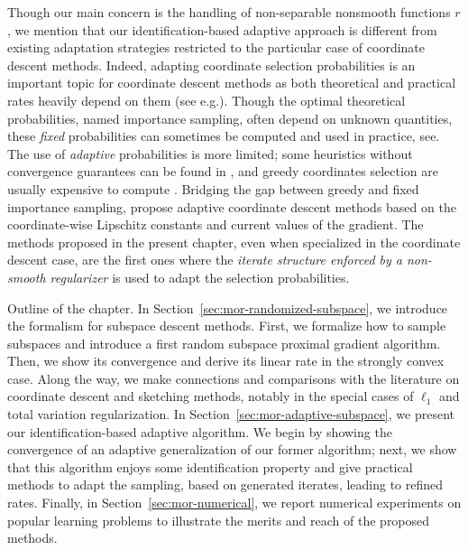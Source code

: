 Though our main concern is the handling of non-separable nonsmooth functions $r$, we mention that our identification-based adaptive approach is different from existing adaptation strategies restricted to the particular case of coordinate descent methods. Indeed, adapting coordinate selection probabilities is an important topic for coordinate descent methods as both theoretical and practical rates heavily depend on them (see e.g.\;\cite{richtarik2014iteration,necoara2014random}).
Though the optimal theoretical probabilities, named importance sampling, often depend on unknown quantities, these \emph{fixed} probabilities can sometimes be computed and used in practice, see\;\cite{zhao2015stochastic,richtarik2016optimal}.
The use of \emph{adaptive} probabilities is more limited; some heuristics without convergence guarantees can be found in \cite{loshchilov2011adaptive,glasmachers2013accelerated}, and greedy coordinates selection
are usually expensive to compute \cite{dhillon2011nearest,nutini2015coordinate,nutini2017let}. Bridging the gap between greedy and fixed importance sampling, \cite{perekrestenko2017faster,namkoong2017adaptive,stich2017safe} propose adaptive coordinate descent methods based on the coordinate-wise Lipschitz constants and current values of the gradient. 
The methods proposed in the present chapter, even when specialized in the coordinate descent case, are the first ones where the \emph{iterate structure enforced by a non-smooth regularizer} is used to adapt the selection probabilities.

{\color{red} Outline of the chapter. In Section~\ref{sec:mor-randomized-subspace}, we introduce the formalism for subspace descent methods. First, we formalize how to sample subspaces and introduce a first random subspace proximal gradient algorithm. Then, we show its convergence and derive its linear rate in the strongly convex case. Along the way, we make connections and comparisons with the literature on coordinate descent and sketching methods, notably in the special cases of $\ell_1$ and total variation regularization. In Section~\ref{sec:mor-adaptive-subspace}, we present our identification-based adaptive algorithm. We begin by showing the convergence of an adaptive generalization of our former algorithm; next, we show that this algorithm enjoys some identification property and give practical methods to adapt the sampling, based on generated iterates, leading to refined rates. Finally, in Section~\ref{sec:mor-numerical}, we report numerical experiments on popular learning problems to illustrate the merits and reach of the proposed methods.
}
